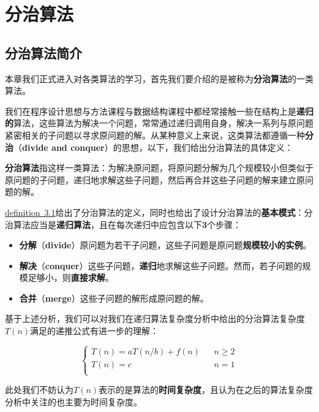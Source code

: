 \documentclass[12pt,a4paper,violet,oneside]{bbe}
\begin{document}
\setcounter{chapter}{2}
\chapter{分治算法}
\section{分治算法简介}
本章我们正式进入对各类算法的学习，首先我们要介绍的是被称为\textbf{分治算法}的一类算法。

我们在程序设计思想与方法课程与数据结构课程中都经常接触一些在结构上是\textbf{递归的}算法，这些算法为解决一个问题，常常通过递归调用自身，解决一系列与原问题紧密相关的子问题以寻求原问题的解。从某种意义上来说，这类算法都遵循一种\textbf{分治}（\textbf{divide and conquer}）的思想，以下，我们给出分治算法的具体定义：
\begin{definition}\label{def3.1}
	\textbf{分治算法}指这样一类算法：为解决原问题，将原问题分解为几个规模较小但类似于原问题的子问题，递归地求解这些子问题，然后再合并这些子问题的解来建立原问题的解。
\end{definition}

\hyperref[def3.1]{definition~3.1}给出了分治算法的定义，同时也给出了设计分治算法的\textbf{基本模式}：分治算法应当是\textbf{递归算法}，且在每次递归中应包含以下\textbf{3}个步骤：
\begin{itemize}
	\item \textbf{分解}（\textbf{divide}）原问题为若干子问题，这些子问题是原问题\textbf{规模较小的实例}。
	\item \textbf{解决}（\textbf{conquer}）这些子问题，\textbf{递归}地求解这些子问题。然而，若子问题的规模足够小，则\textbf{直接求解}。
	\item \textbf{合并}（\textbf{merge}）这些子问题的解形成原问题的解。
\end{itemize}

基于上述分析，我们可以对我们在递归算法复杂度分析中给出的分治算法复杂度$T(n)$满足的递推公式有进一步的理解：

$$
\left\{
\begin{array}{lcc}
	T(n)=aT(n/b)+f(n)&&n\geqslant2\\
	T(n)=c&&n=1\\
\end{array}\right.
$$


\begin{remark}
	此处我们不妨认为$T(n)$表示的是算法的\textbf{时间复杂度}，且认为在之后的算法复杂度分析中关注的也主要为时间复杂度。
\end{remark}
\end{document}
